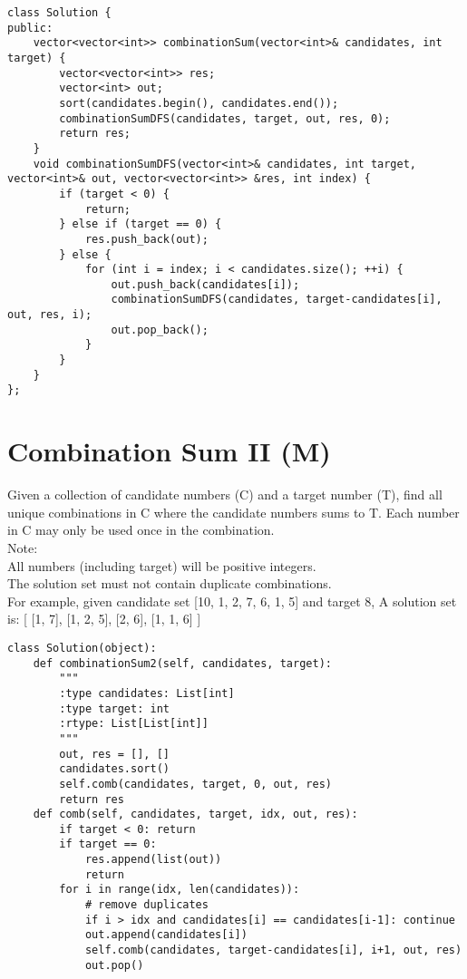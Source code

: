 \begin{lstlisting}
class Solution {
public:
    vector<vector<int>> combinationSum(vector<int>& candidates, int target) {
        vector<vector<int>> res;
        vector<int> out;
        sort(candidates.begin(), candidates.end());
        combinationSumDFS(candidates, target, out, res, 0);
        return res;
    }
    void combinationSumDFS(vector<int>& candidates, int target, vector<int>& out, vector<vector<int>> &res, int index) {
        if (target < 0) {
            return;
        } else if (target == 0) {
            res.push_back(out);
        } else {
            for (int i = index; i < candidates.size(); ++i) {
                out.push_back(candidates[i]);
                combinationSumDFS(candidates, target-candidates[i], out, res, i);
                out.pop_back();
            }
        }
    }
};
\end{lstlisting}


\section{Combination Sum II (M)}
Given a collection of candidate numbers (C) and a target number (T), find all unique combinations in C where the candidate numbers sums to T. Each number in C may only be used once in the combination.\\

Note:\\
    All numbers (including target) will be positive integers.\\
    The solution set must not contain duplicate combinations.\\

For example, given candidate set [10, 1, 2, 7, 6, 1, 5] and target 8, A solution set is: [ [1, 7], [1, 2, 5], [2, 6], [1, 1, 6] ] \\

\begin{lstlisting}
class Solution(object):
    def combinationSum2(self, candidates, target):
        """
        :type candidates: List[int]
        :type target: int
        :rtype: List[List[int]]
        """
        out, res = [], []
        candidates.sort()
        self.comb(candidates, target, 0, out, res)
        return res
    def comb(self, candidates, target, idx, out, res):
        if target < 0: return
        if target == 0:
            res.append(list(out))
            return
        for i in range(idx, len(candidates)):
            # remove duplicates
            if i > idx and candidates[i] == candidates[i-1]: continue
            out.append(candidates[i])
            self.comb(candidates, target-candidates[i], i+1, out, res)
            out.pop()
\end{lstlisting}


